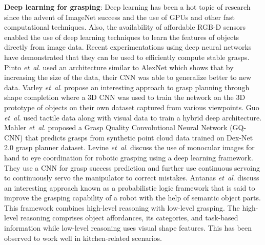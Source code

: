\documentclass[letterpaper, 10 pt, conference]{ieeeconf}
\newcommand{\etal}{\textit{et~al}. }
\begin{document}
\textbf{Deep learning for grasping}: Deep learning has been a hot topic of research since the advent of ImageNet success and the use of GPU\textquotesingle s and other fast computational techniques. Also, the availability of affordable RGB-D sensors enabled the use of deep learning techniques to learn the features of objects directly from image data. Recent experimentations using deep neural networks \cite{redmon2015real,schmidt2018grasping,zeng2018robotic} have demonstrated that they can be used to efficiently compute stable grasps. Pinto \etal \cite{pinto2016supersizing} used an architecture similar to AlexNet which shows that by increasing the size of the data, their CNN was able to generalize better to new data.  Varley \etal \cite{varley2017shape} propose an interesting approach to grasp planning through shape completion where a 3D CNN was used to train the network on the 3D prototype of objects on their own dataset captured from various viewpoints. Guo \etal \cite{guo2017hybrid} used tactile data along with visual data to train a hybrid deep architecture. Mahler \etal \cite{mahler2017dex} proposed a Grasp Quality Convolutional Neural Network (GQ-CNN) that predicts grasps from synthetic point cloud data trained on Dex-Net 2.0 grasp planner dataset. Levine \etal \cite{levine2018learning} discuss the use of monocular images for hand to eye coordination for robotic grasping using a deep learning framework. They use a CNN for grasp success prediction and further use continuous servoing to continuously servo the manipulator to correct mistakes. Antanas \etal \cite{antanas2019semantic} discuss an interesting approach known as a probabilistic logic framework that is said to improve the grasping capability of a robot with the help of semantic object parts. This framework combines high-level reasoning with low-level grasping. The high-level reasoning comprises object affordances, its categories, and task-based information while low-level reasoning uses visual shape features. This has been observed to work well in kitchen-related scenarios.
\end{document}
